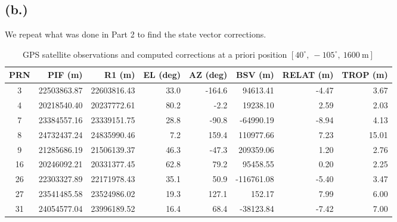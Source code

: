 \documentclass[11pt]{article}
\begin{document}
\subsection*{(b.)}
\hspace*{2em}We repeat what was done in Part 2 to find the state vector corrections. 

\begin{table}[h!]
    \centering
    \small
    \begin{tabular}{|c|r|r|r|r|r|r|r|}
        \hline
        \textbf{PRN} & \textbf{PIF (m)} & \textbf{R1 (m)} &
        \textbf{EL (deg)} & \textbf{AZ (deg)} &
        \textbf{BSV (m)} & \textbf{RELAT (m)} &
        \textbf{TROP (m)} \\
        \hline
        3  & 22503863.87 & 22603816.43 & 33.0 & -164.6 & 94613.41 & -4.47 & 3.67 \\ \hline
        4  & 20218540.40 & 20237772.61 & 80.2 & -2.2 & 19238.10 &  2.59 & 2.03 \\ \hline
        7  & 23384557.16 & 23339151.75 & 28.8 & -90.8 & -64990.19 & -8.94 & 4.13 \\ \hline
        8  & 24732437.24 & 24835990.46 &  7.2 & 159.4 & 110977.66 &  7.23 & 15.01 \\ \hline
        9  & 21285686.19 & 21506139.37 & 46.3 & -47.3 & 209359.06 &  1.20 & 2.76 \\ \hline
        16 & 20246092.21 & 20331377.45 & 62.8 &  79.2 & 95458.55 &  0.20 & 2.25 \\ \hline
        26 & 22303327.89 & 22171978.43 & 35.1 &  50.9 & -116761.08 & -5.40 & 3.47 \\ \hline
        27 & 23541485.58 & 23524986.02 & 19.3 & 127.1 & 152.17 &  7.99 & 6.00 \\ \hline
        31 & 24054577.04 & 23996189.52 & 16.4 &  68.4 & -38123.84 & -7.42 & 7.00 \\ \hline
    \end{tabular}
    \caption{GPS satellite observations and computed corrections at a priori position $[40^\circ,\ -105^\circ,\ 1600~\mathrm{m}]$}
    \label{tab:gps_observations_p3}
\end{table}
\end{document}

